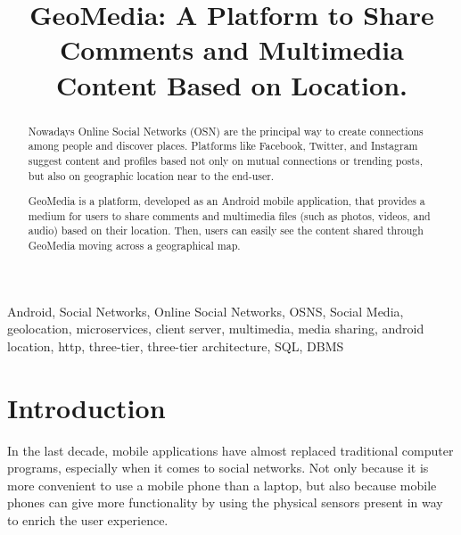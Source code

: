 \documentclass[conference]{IEEEtran}
\begin{document}
\title{GeoMedia: A Platform to Share Comments and Multimedia Content Based on Location.\\
}

\author{
\and
{}
}

\maketitle

\begin{abstract}
Nowadays Online Social Networks (OSN) are the principal way to create connections among people and discover places.
Platforms like Facebook, Twitter, and Instagram suggest content and profiles based not only on mutual connections or trending posts, but also on geographic location near to the end-user.

GeoMedia is a platform, developed as an Android mobile application, that provides a medium for users to share comments and multimedia files (such as photos, videos, and audio) based on their location.
Then, users can easily see the content shared through GeoMedia moving across a geographical map.
\end{abstract}

\begin{IEEEkeywords}
Android, Social Networks, Online Social Networks, OSNS, Social Media, geolocation, microservices, client server, multimedia, media sharing, android location, http, three-tier, three-tier architecture, SQL, DBMS
\end{IEEEkeywords}

\section{Introduction}
In the last decade, mobile applications have almost replaced traditional computer programs, especially when it comes to social networks. Not only because it is more convenient to use a mobile phone than a laptop, but also because mobile phones can give more functionality by using the physical sensors present in way to enrich the user experience.
\end{document}
